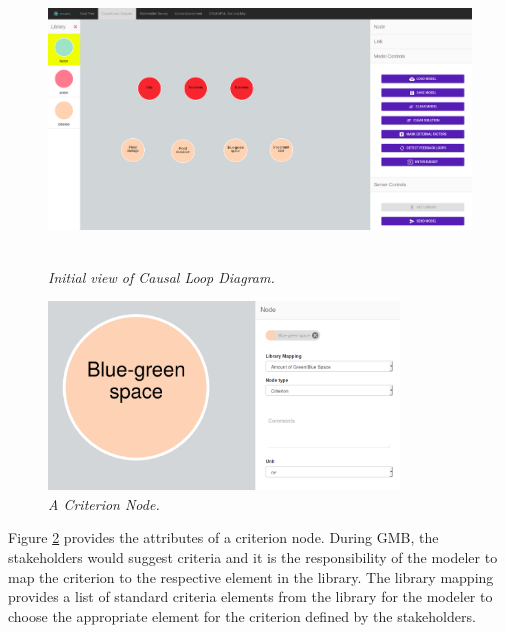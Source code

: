 \documentclass[a4paper]{article}
\begin{document}
\begin{figure}
\begin{center}
\includegraphics[height=3in,width=5in]{img/cld1.png}
\caption{\small \sl Initial view of Causal Loop Diagram.\label{fig:cld1}}
\end{center}
\end{figure}

\begin{figure}
\begin{center}
\includegraphics[width=0.75\linewidth, height=5cm]{img/criterion.png}
\caption{\small \sl A Criterion Node.\label{fig:criterion}}
\end{center}
\end{figure}

Figure \ref{fig:criterion} provides the attributes of a criterion node. During GMB, the stakeholders would suggest criteria and it is the responsibility of the modeler to map the criterion to the respective element in the library. The library mapping provides a list of standard criteria elements from the library for the modeler to choose the appropriate element for the criterion defined by the stakeholders.
\end{document}
